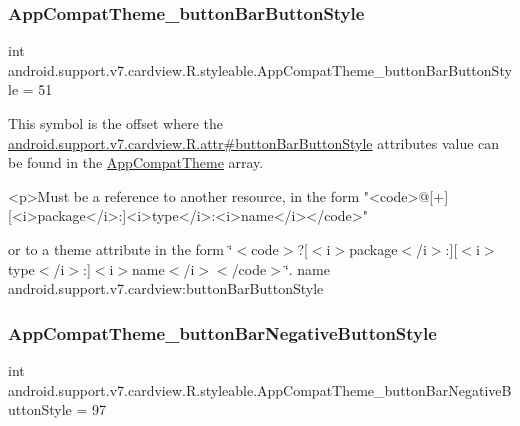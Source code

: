 \subsubsection{\texorpdfstring{App\+Compat\+Theme\+\_\+button\+Bar\+Button\+Style}{AppCompatTheme\_buttonBarButtonStyle}}
{\footnotesize\ttfamily int android.\+support.\+v7.\+cardview.\+R.\+styleable.\+App\+Compat\+Theme\+\_\+button\+Bar\+Button\+Style = 51\hspace{0.3cm}{\ttfamily [static]}}

This symbol is the offset where the \hyperlink{classandroid_1_1support_1_1v7_1_1cardview_1_1R_1_1attr_ad41eb3028d5151ba75e3688b33611e57}{android.\+support.\+v7.\+cardview.\+R.\+attr\#button\+Bar\+Button\+Style} attribute\textquotesingle{}s value can be found in the \hyperlink{classandroid_1_1support_1_1v7_1_1cardview_1_1R_1_1styleable_a52e6f69f954ecc2622d72c0b4d298938}{App\+Compat\+Theme} array.

\begin{DoxyVerb}      <p>Must be a reference to another resource, in the form "<code>@[+][<i>package</i>:]<i>type</i>:<i>name</i></code>"
\end{DoxyVerb}
 or to a theme attribute in the form \char`\"{}$<$code$>$?\mbox{[}$<$i$>$package$<$/i$>$\+:\mbox{]}\mbox{[}$<$i$>$type$<$/i$>$\+:\mbox{]}$<$i$>$name$<$/i$>$$<$/code$>$\char`\"{}.  name android.\+support.\+v7.\+cardview\+:button\+Bar\+Button\+Style \mbox{\label{classandroid_1_1support_1_1v7_1_1cardview_1_1R_1_1styleable_a3f0d3655b3dc02d0f7f8bac6422802ad}} 
\subsubsection{\texorpdfstring{App\+Compat\+Theme\+\_\+button\+Bar\+Negative\+Button\+Style}{AppCompatTheme\_buttonBarNegativeButtonStyle}}
{\footnotesize\ttfamily int android.\+support.\+v7.\+cardview.\+R.\+styleable.\+App\+Compat\+Theme\+\_\+button\+Bar\+Negative\+Button\+Style = 97\hspace{0.3cm}{\ttfamily [static]}}

